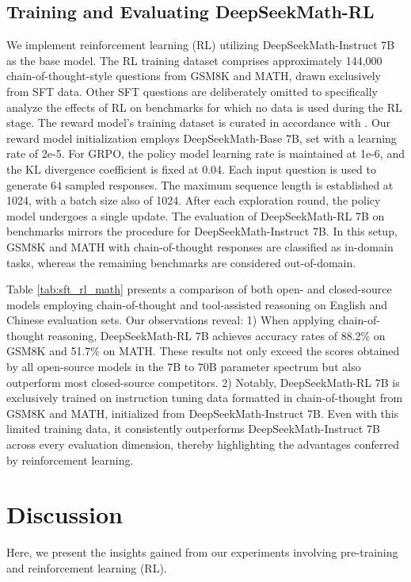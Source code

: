 \begin{itemize}[topsep=0pt]
\subsection{Training and Evaluating DeepSeekMath-RL}

We implement reinforcement learning (RL) utilizing DeepSeekMath-Instruct 7B as the base model. The RL training dataset comprises approximately 144,000 chain-of-thought-style questions from GSM8K and MATH, drawn exclusively from SFT data. Other SFT questions are deliberately omitted to specifically analyze the effects of RL on benchmarks for which no data is used during the RL stage. The reward model’s training dataset is curated in accordance with \citep{wang2023math}. Our reward model initialization employs DeepSeekMath-Base 7B, set with a learning rate of 2e-5. For GRPO, the policy model learning rate is maintained at 1e-6, and the KL divergence coefficient is fixed at 0.04. Each input question is used to generate $64$ sampled responses. The maximum sequence length is established at 1024, with a batch size also of 1024. After each exploration round, the policy model undergoes a single update. The evaluation of DeepSeekMath-RL 7B on benchmarks mirrors the procedure for DeepSeekMath-Instruct 7B. In this setup, GSM8K and MATH with chain-of-thought responses are classified as in-domain tasks, whereas the remaining benchmarks are considered out-of-domain.

Table \ref{tab:sft_rl_math} presents a comparison of both open- and closed-source models employing chain-of-thought and tool-assisted reasoning on English and Chinese evaluation sets. Our observations reveal: 1) When applying chain-of-thought reasoning, DeepSeekMath-RL 7B achieves accuracy rates of 88.2\% on GSM8K and 51.7\% on MATH. These results not only exceed the scores obtained by all open-source models in the 7B to 70B parameter spectrum but also outperform most closed-source competitors. 2) Notably, DeepSeekMath-RL 7B is exclusively trained on instruction tuning data formatted in chain-of-thought from GSM8K and MATH, initialized from DeepSeekMath-Instruct 7B. Even with this limited training data, it consistently outperforms DeepSeekMath-Instruct 7B across every evaluation dimension, thereby highlighting the advantages conferred by reinforcement learning.

\section{Discussion}
Here, we present the insights gained from our experiments involving pre-training and reinforcement learning (RL).


\end{itemize}
